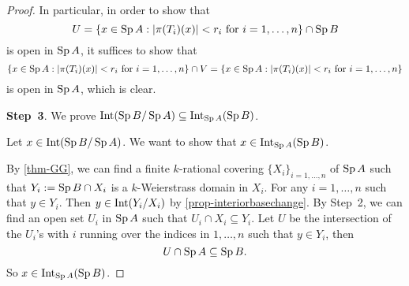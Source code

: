 \begin{proof}
    In particular, in order to show that
    \[
        U=\left\{x\in \operatorname{Sp} A: |\pi(T_i)(x)|< r_i\text{ for }i=1,\ldots,n\right\}\cap \operatorname{Sp} B
    \]
    is open in $\operatorname{Sp} A$, it suffices to show that
    \[
        \left\{x\in \operatorname{Sp} A: |\pi(T_i)(x)|< r_i\text{ for }i=1,\ldots,n\right\}\cap V=\left\{x\in \operatorname{Sp} A: |\pi(T_i)(x)|< r_i\text{ for }i=1,\ldots,n\right\}
    \]
    is open in $\operatorname{Sp} A$, which is clear.
    



    \textbf{Step~3}. We prove $\operatorname{Int}(\operatorname{Sp} B/\operatorname{Sp} A)\subseteq \operatorname{Int}_{\operatorname{Sp} A}(\operatorname{Sp} B)$.

    
    Let $x\in \operatorname{Int}(\operatorname{Sp} B/\operatorname{Sp} A)$. We want to show that $x\in \operatorname{Int}_{\operatorname{Sp} A}(\operatorname{Sp} B)$.

    By \cref{thm-GG}, we can find a finite $k$-rational covering $\{X_i\}_{i=1,\ldots,n}$ of $\operatorname{Sp} A$ such that $Y_i:=\operatorname{Sp} B\cap X_i$ is a $k$-Weierstrass domain in $X_i$. For any $i=1,\ldots,n$ such that $y\in Y_i$. Then $y\in \operatorname{Int}(Y_i/X_i)$ by \cref{prop-interiorbasechange}. By Step~2, we can find an open set $U_i$ in $\operatorname{Sp} A$ such that $U_i\cap X_i\subseteq Y_i$. Let $U$ be the intersection of the $U_i$'s with $i$ running over the indices in $1,\ldots,n$ such that $y\in Y_i$, then
    \[
        U\cap \operatorname{Sp} A\subseteq \operatorname{Sp} B.
    \]
    So $x\in \operatorname{Int}_{\operatorname{Sp} A}(\operatorname{Sp} B)$.
\end{proof}

\printbibliography
